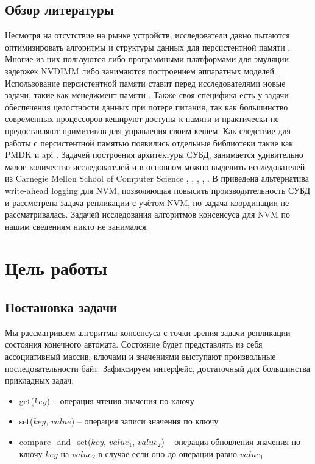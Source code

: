 \documentclass[pdftex,ptm,12pt,a4paper]{report}
\theoremstyle{definition}
\begin{document}
\section{Обзор литературы}
Несмотря на отсутствие на рынке устройств, исследователи давно пытаются оптимизировать алгоритмы \cite{iwabuchi2014nvm} и структуры данных \cite{chen2015persistent} для персистентной памяти .
Многие из них пользуются либо программными платформами для эмуляции задержек NVDIMM \cite{sengupta2015framework} либо занимаются построением аппаратных моделей \cite{dong2012nvsim}.
Использование персистентной памяти ставит перед исследователями новые задачи, такие как менеджмент памяти \cite{schwalb2015nvm}. Также своя специфика есть у задачи обеспечения
целостности данных при потере питания, так как большинство современных процессоров кешируют доступы к памяти и практически не предоставляют примитивов для управления своим кешем.
Как следствие для работы с персистентной памятью появились отдельные библиотеки такие как PMDK \cite{pmdk} и api \cite{kolli2016delegated}.
Задачей построения архитектуры СУБД, занимается удивительно малое количество исследователей и в основном можно выделить исследователей из Carnegie Mellon School of Computer Science
\cite{pavlo17}, \cite{arulraj2015let}, \cite{debrabant2014prolegomenon}, \cite{arulraj2017build}, \cite{writebehind}.  В \cite{writebehind} приведeна альтернатива write-ahead logging
для NVM, позволяющая повысить производительность СУБД и рассмотрена задача репликации с учётом NVM, но задача координации не рассматривалась.
Задачей исследования алгоритмов консенсуса для NVM по нашим сведениям никто не занимался.

\chapter{Цель работы}
\section{Постановка задачи}
Мы рассматриваем алгоритмы консенсуса с точки зрения задачи репликации состояния конечного автомата. Состояние будет представлять из себя ассоциативный массив, ключами и значениями
выступают произвольные последовательности байт. Зафиксируем интерфейс, достаточный для большинства прикладных задач:
\begin{itemize}
    \item get($key$) -- операция чтения значения по ключу
    \item set($key$, $value$) -- операция записи значения по ключу
    \item compare\_and\_set($key$, $value_1$, $value_2$) -- операция обновления значения по ключу $key$ на $value_2$ в случае если оно до операции равно $value_1$
\end{itemize}
\end{document}
